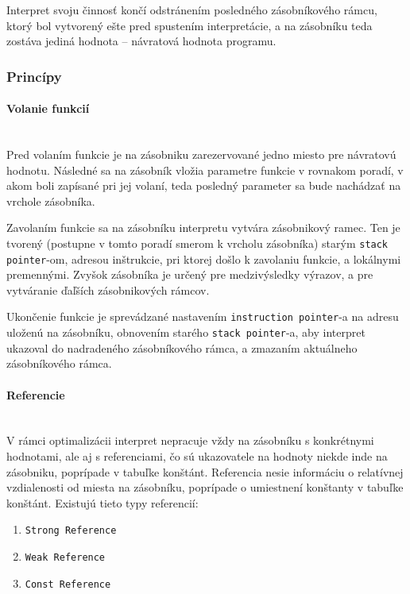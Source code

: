 \documentclass[12pt,a4paper,titlepage,final]{article}
\begin{document}
Interpret svoju činnosť končí odstránením posledného zásobníkového rámcu, ktorý bol vytvorený ešte pred spustením
interpretácie, a na zásobníku teda zostáva jediná hodnota -- návratová hodnota programu. 

\subsubsection{Princípy}

\paragraph{Volanie funkcií}\mbox{}\\

Pred volaním funkcie je na zásobniku zarezervované jedno miesto pre návratovú hodnotu.
Následné sa na zásobník vložia parametre funkcie v rovnakom poradí, v akom boli zapísané pri
jej volaní, teda posledný parameter sa bude nachádzať na vrchole zásobníka. 

Zavolaním funkcie sa na zásobníku interpretu vytvára zásobnikový ramec. Ten je tvorený (postupne v tomto
poradí smerom k vrcholu zásobníka) starým \texttt{stack pointer}-om, adresou inštrukcie, pri ktorej došlo k
zavolaniu funkcie, a lokálnymi premennými. Zvyšok zásobníka je určený pre medzivýsledky výrazov, a pre
vytváranie ďaľších zásobnikových rámcov.

Ukončenie funkcie je sprevádzané nastavením \texttt{instruction pointer}-a na adresu uloženú na zásobníku,
obnovením starého \texttt{stack pointer}-a, aby interpret ukazoval do nadradeného zásobníkového rámca,
a zmazaním aktuálneho zásobníkového rámca.

\paragraph{Referencie}\mbox{}\\

V rámci optimalizácii interpret nepracuje vždy na zásobníku s konkrétnymi hodnotami,
ale aj s referenciami, čo sú ukazovatele na hodnoty niekde inde na zásobniku, poprípade
v tabuľke konštánt. Referencia nesie informáciu o relatívnej vzdialenosti od miesta
na zásobníku, poprípade o umiestnení konštanty v tabuľke konštánt. Existujú tieto typy referencií:

\begin{enumerate}
    \itemsep0em
    \item \texttt{Strong Reference}
    \item \texttt{Weak Reference}
    \item \texttt{Const Reference}
\end{enumerate}
\end{document}
